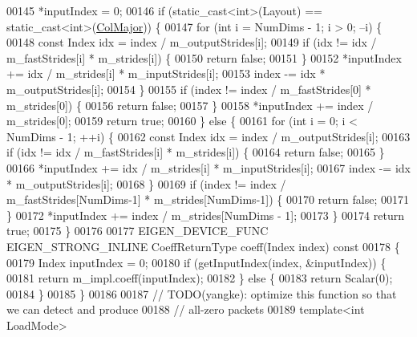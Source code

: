 \begin{DoxyCode}
00145     *inputIndex = 0;
00146     \textcolor{keywordflow}{if} (static\_cast<int>(Layout) == static\_cast<int>(\hyperlink{group__enums_ggaacded1a18ae58b0f554751f6cdf9eb13a0cbd4bdd0abcfc0224c5fcb5e4f6669a}{ColMajor})) \{
00147       \textcolor{keywordflow}{for} (\textcolor{keywordtype}{int} i = NumDims - 1; i > 0; --i) \{
00148         \textcolor{keyword}{const} Index idx = index / m\_outputStrides[i];
00149         \textcolor{keywordflow}{if} (idx != idx / m\_fastStrides[i] * m\_strides[i]) \{
00150           \textcolor{keywordflow}{return} \textcolor{keyword}{false};
00151         \}
00152         *inputIndex += idx / m\_strides[i] * m\_inputStrides[i];
00153         index -= idx * m\_outputStrides[i];
00154       \}
00155       \textcolor{keywordflow}{if} (index != index / m\_fastStrides[0] * m\_strides[0]) \{
00156         \textcolor{keywordflow}{return} \textcolor{keyword}{false};
00157       \}
00158       *inputIndex += index / m\_strides[0];
00159       \textcolor{keywordflow}{return} \textcolor{keyword}{true};
00160     \} \textcolor{keywordflow}{else} \{
00161       \textcolor{keywordflow}{for} (\textcolor{keywordtype}{int} i = 0; i < NumDims - 1; ++i) \{
00162         \textcolor{keyword}{const} Index idx = index / m\_outputStrides[i];
00163         \textcolor{keywordflow}{if} (idx != idx / m\_fastStrides[i] * m\_strides[i]) \{
00164           \textcolor{keywordflow}{return} \textcolor{keyword}{false};
00165         \}
00166         *inputIndex += idx / m\_strides[i] * m\_inputStrides[i];
00167         index -= idx * m\_outputStrides[i];
00168       \}
00169       \textcolor{keywordflow}{if} (index != index / m\_fastStrides[NumDims-1] * m\_strides[NumDims-1]) \{
00170         \textcolor{keywordflow}{return} \textcolor{keyword}{false};
00171       \}
00172       *inputIndex += index / m\_strides[NumDims - 1];
00173     \}
00174     \textcolor{keywordflow}{return} \textcolor{keyword}{true};
00175   \}
00176 
00177   EIGEN\_DEVICE\_FUNC EIGEN\_STRONG\_INLINE CoeffReturnType coeff(Index index)\textcolor{keyword}{ const}
00178 \textcolor{keyword}{  }\{
00179     Index inputIndex = 0;
00180     \textcolor{keywordflow}{if} (getInputIndex(index, &inputIndex)) \{
00181      \textcolor{keywordflow}{return} m\_impl.coeff(inputIndex);
00182     \} \textcolor{keywordflow}{else} \{
00183      \textcolor{keywordflow}{return} Scalar(0);
00184     \}
00185   \}
00186 
00187   \textcolor{comment}{// TODO(yangke): optimize this function so that we can detect and produce}
00188   \textcolor{comment}{// all-zero packets}
00189   \textcolor{keyword}{template}<\textcolor{keywordtype}{int} LoadMode>

\end{DoxyCode}
